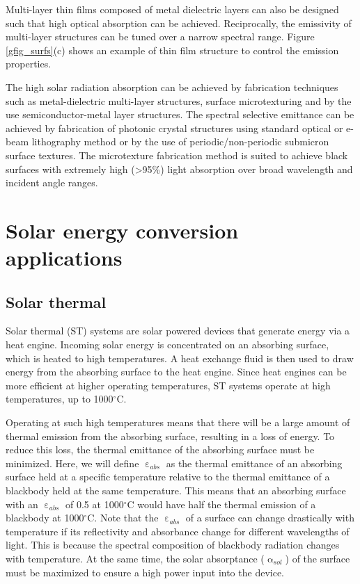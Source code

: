 \documentclass[10pt,letterpaper]{article}
\begin{document}
{Multi-layer thin films composed of metal dielectric layers can also be designed such that high optical absorption can be achieved.  Reciprocally, the emissivity of multi-layer structures can be tuned over a narrow spectral range. Figure \ref{gfig_surfs}(c) shows an example of thin film structure to control the emission properties. 

The high solar radiation absorption can be achieved by fabrication techniques such as metal-dielectric multi-layer structures, surface microtexturing and by the use semiconductor-metal layer structures. The spectral selective emittance can be achieved by fabrication of photonic crystal structures using standard optical or e-beam lithography method or by the use of periodic/non-periodic submicron surface textures.  The microtexture fabrication method is suited to achieve black surfaces with extremely high (\textgreater95\%) light absorption over broad wavelength and incident angle ranges.

\section{Solar energy conversion applications}
\subsection{Solar thermal}
Solar thermal (ST) systems are solar powered devices that generate energy via a heat engine.  Incoming solar energy is concentrated on an absorbing surface, which is heated to high temperatures.  A heat exchange fluid is then used to draw energy from the absorbing surface to the heat engine.  Since heat engines can be more efficient at higher operating temperatures, ST systems operate at high temperatures, up to 1000$^\circ$C.

Operating at such high temperatures means that there will be a large amount of thermal emission from the absorbing surface, resulting in a loss of energy.  To reduce this loss, the thermal emittance of the absorbing surface must be minimized.  Here, we will define $\upepsilon_{abs}$ as the thermal emittance of an absorbing surface held at a specific temperature relative to the thermal emittance of a blackbody held at the same temperature.  This means that an absorbing surface with an $\upepsilon_{abs}$ of 0.5 at 1000$^\circ$C would have half the thermal emission of a blackbody at 1000$^\circ$C.  Note that the $\upepsilon_{abs}$ of a surface can change drastically with temperature if its reflectivity and absorbance change for different wavelengths of light.  This is because the spectral composition of blackbody radiation changes with temperature.  At the same time, the solar absorptance ($\upalpha_{sol}$) of the surface must be maximized to ensure a high power input into the device.

}
\end{document}
